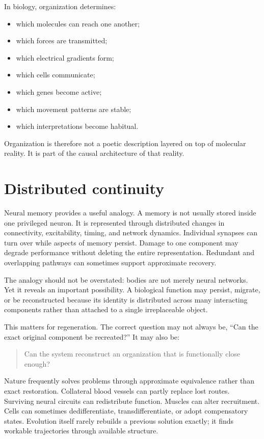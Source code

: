In biology, organization determines:

\begin{itemize}
\tightlist
\item
  which molecules can reach one another;
\item
  which forces are transmitted;
\item
  which electrical gradients form;
\item
  which cells communicate;
\item
  which genes become active;
\item
  which movement patterns are stable;
\item
  which interpretations become habitual.
\end{itemize}

Organization is therefore not a poetic description layered on top of molecular reality. It is part of the causal architecture of that reality.

\section{Distributed continuity}

Neural memory provides a useful analogy. A memory is not usually stored inside one privileged neuron. It is represented through distributed changes in connectivity, excitability, timing, and network dynamics. Individual synapses can turn over while aspects of memory persist. Damage to one component may degrade performance without deleting the entire representation. Redundant and overlapping pathways can sometimes support approximate recovery.

The analogy should not be overstated: bodies are not merely neural networks. Yet it reveals an important possibility. A biological function may persist, migrate, or be reconstructed because its identity is distributed across many interacting components rather than attached to a single irreplaceable object.

This matters for regeneration. The correct question may not always be, ``Can the exact original component be recreated?'' It may also be:

\begin{quote}
Can the system reconstruct an organization that is functionally close enough?
\end{quote}

Nature frequently solves problems through approximate equivalence rather than exact restoration. Collateral blood vessels can partly replace lost routes. Surviving neural circuits can redistribute function. Muscles can alter recruitment. Cells can sometimes dedifferentiate, transdifferentiate, or adopt compensatory states. Evolution itself rarely rebuilds a previous solution exactly; it finds workable trajectories through available structure.

